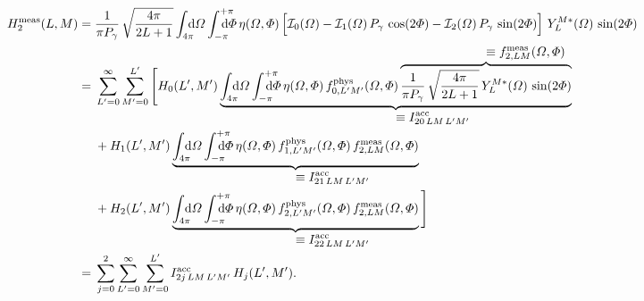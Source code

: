 \begin{align}
  H_2^\text{meas}(L, M)
  ={}& \frac{1}{\pi P_\gamma}\, \sqrt{\frac{4 \pi}{2 L + 1}} \int_{4 \pi}\!\!\!\! \dif{\Omega} \int_{-\pi}^{+\pi}\hspace{-1.2em} \dif{\Phi}\,
  \eta(\Omega, \Phi) \sBrk[2]{\intensity_0(\Omega)
  - \intensity_1(\Omega)\, P_\gamma\, \cos(2 \Phi)
  - \intensity_2(\Omega)\, P_\gamma\, \sin(2 \Phi)}\,
  Y_L^{M *}(\Omega)\, \sin(2 \Phi) \nonumber
  \\
  ={}& \sum_{L' = 0}^\infty \sum_{M' = 0}^{L'} \Bigg[
  H_0(L', M')\,
  \rdUnderbrace{\int_{4 \pi}\!\!\!\! \dif{\Omega} \int_{-\pi}^{+\pi}\hspace{-1.2em} \dif{\Phi}\,
  \eta(\Omega, \Phi)\,
  f_{0, L' M'}^\text{phys}(\Omega, \Phi)\,
  \rdOverbrace{\frac{1}{\pi P_\gamma}\, \sqrt{\frac{4 \pi}{2 L + 1}}\, Y_L^{M *}(\Omega)\, \sin(2 \Phi)}{\equiv f_{2, L M}^\text{meas}(\Omega, \Phi)}}%
  {\equiv I^\text{acc}_{2 0\, L M\, L' M'}} \nonumber
  \\
  & + H_1(L', M')\,
  \rdUnderbrace{\int_{4 \pi}\!\!\!\! \dif{\Omega} \int_{-\pi}^{+\pi}\hspace{-1.2em} \dif{\Phi}\,
  \eta(\Omega, \Phi)\,
  f_{1, L' M'}^\text{phys}(\Omega, \Phi)\,
  f_{2, L M}^\text{meas}(\Omega, \Phi)}%
  {\equiv I^\text{acc}_{2 1\, L M\, L' M'}} \nonumber
  \\
  & + H_2(L', M')\,
  \rdUnderbrace{\int_{4 \pi}\!\!\!\! \dif{\Omega} \int_{-\pi}^{+\pi}\hspace{-1.2em} \dif{\Phi}\,
  \eta(\Omega, \Phi)\,
  f_{2, L' M'}^\text{phys}(\Omega, \Phi)\,
  f_{2, L M}^\text{meas}(\Omega, \Phi)}%
  {\equiv I^\text{acc}_{2 2\, L M\, L' M'}}\, \Bigg] \nonumber
  \\
  \label{eq:photoprod_moment_2_meas2}
  ={}& \sum_{j = 0}^2 \sum_{L' = 0}^\infty \sum_{M' = 0}^{L'}
  I^\text{acc}_{2 j\, L M\, L' M'}\, H_j(L', M').
\end{align}

